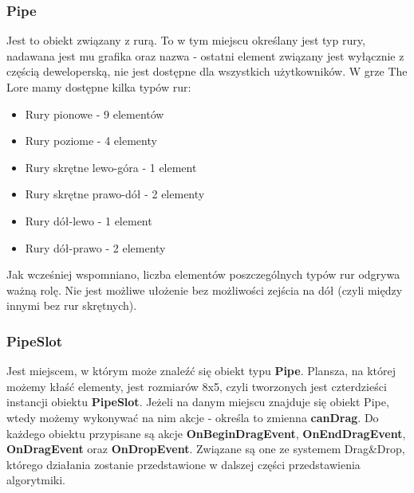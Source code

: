 \documentclass[oneside,polski,logo]{amuthesis}
\begin{document}
\subsubsection{Pipe}
Jest to obiekt związany z rurą. To w tym miejscu określany jest typ rury, nadawana jest mu grafika oraz nazwa - ostatni element związany jest wyłącznie z częścią deweloperską, nie jest dostępne dla wszystkich użytkowników. W grze The Lore mamy dostępne kilka typów rur:
\begin{itemize}
  \item Rury pionowe - 9 elementów
  \item Rury poziome - 4 elementy
  \item Rury skrętne lewo-góra - 1 element
  \item Rury skrętne prawo-dół - 2 elementy
  \item Rury dół-lewo -  1 element
  \item Rury dół-prawo - 2 elementy
\end{itemize}
Jak wcześniej wspomniano, liczba elementów poszczególnych typów rur odgrywa ważną rolę. Nie jest możliwe ułożenie bez możliwości zejścia na dół (czyli między innymi bez rur skrętnych). 
\subsubsection{PipeSlot}
Jest miejscem, w którym może znaleźć się obiekt typu \textbf{Pipe}. Plansza, na której możemy kłaść elementy, jest rozmiarów 8x5, czyli tworzonych jest czterdzieści instancji obiektu \textbf{PipeSlot}. Jeżeli na danym miejscu znajduje się obiekt Pipe, wtedy możemy wykonywać na nim akcje - określa to zmienna \textbf{canDrag}. Do każdego obiektu przypisane są akcje \textbf{OnBeginDragEvent}, \textbf{OnEndDragEvent}, \textbf{OnDragEvent} oraz \textbf{OnDropEvent}. Związane są one ze systemem Drag\&Drop, którego działania zostanie przedstawione w dalszej części przedstawienia algorytmiki.
\end{document}
